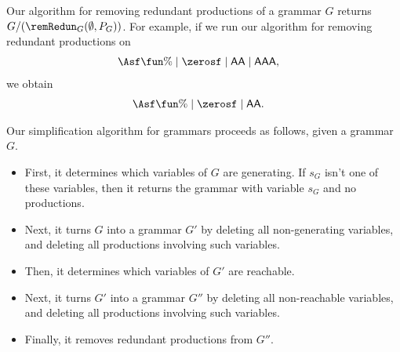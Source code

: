 Our algorithm for removing redundant productions of a grammar $G$
returns $G/(\remRedun_G(\emptyset,P_G))$.
For example, if we run our algorithm for removing redundant productions
on
\begin{align*}
\Asf &\fun \% \mid \zerosf \mid \mathsf{AA} \mid \mathsf{AAA} ,
\end{align*}
we obtain
\begin{align*}
\Asf &\fun \% \mid \zerosf \mid \mathsf{AA} .
\end{align*}

Our simplification algorithm for grammars proceeds as follows, given
a grammar $G$.
\begin{itemize}
\item First, it determines which variables of $G$ are generating.
If $s_G$ isn't one of these variables, then it returns the
grammar with variable $s_G$ and no productions.

\item Next, it turns $G$ into a grammar $G'$ by deleting all
non-generating variables, and deleting all productions involving such
variables.

\item Then, it determines which variables of $G'$ are reachable.

\item Next, it turns $G'$ into a grammar $G''$ by deleting all
non-reachable variables, and deleting all productions involving such
variables.

\item Finally, it removes redundant productions from $G''$.
\end{itemize}

